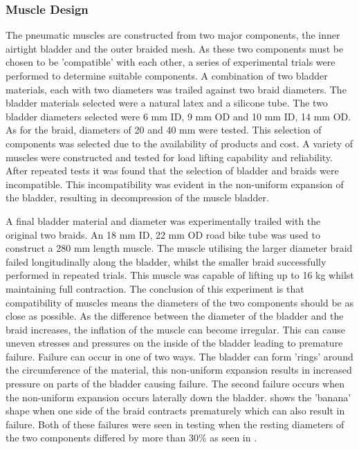 \documentclass[11pt,a4paper]{article}
\begin{document}
\subsubsection{Muscle Design}
\label{subsubsection:muscle_design}
The pneumatic muscles are constructed from two major components, the inner airtight bladder and the outer braided mesh. As these two components must be chosen to be 'compatible' with each other, a series of experimental trials were performed to determine suitable components. A combination of two bladder materials, each with two diameters was trailed against two braid diameters. The bladder materials selected were a natural latex and a silicone tube. The two bladder diameters selected were 6 mm ID, 9 mm OD and 10 mm ID, 14 mm OD. As for the braid, diameters of 20 and 40 mm were tested. This selection of components was selected due to the availability of products and cost. A variety of muscles were constructed and tested for load lifting capability and reliability. After repeated tests it was found that the selection of bladder and braids were incompatible. This incompatibility was evident in the non-uniform expansion of the bladder, resulting in decompression of the muscle bladder. \newline

A final bladder material and diameter was experimentally trailed with the original two braids. An 18 mm ID, 22 mm OD road bike tube was used to construct a 280 mm length muscle. The muscle utilising the larger diameter braid failed longitudinally along the bladder, whilst the smaller braid successfully performed in repeated trials. This muscle was capable of lifting up to 16 kg whilst maintaining full contraction.\newline
The conclusion of this experiment is that compatibility of muscles means the diameters of the two components should be as close as possible. As the difference between the diameter of the bladder and the braid increases, the inflation of the muscle can become irregular. This can cause uneven stresses and pressures on the inside of the bladder leading to premature failure. Failure can occur in one of two ways. The bladder can form 'rings'  around the circumference of the material, this non-uniform expansion results in increased pressure on parts of the bladder causing failure. The second failure occurs when the non-uniform expansion occurs laterally down the bladder.  shows the 'banana' shape when one side of the braid contracts prematurely which can also result in failure. Both of these failures were seen in testing when the resting diameters of the two components differed by more than $30\%$ as seen in .
\end{document}
